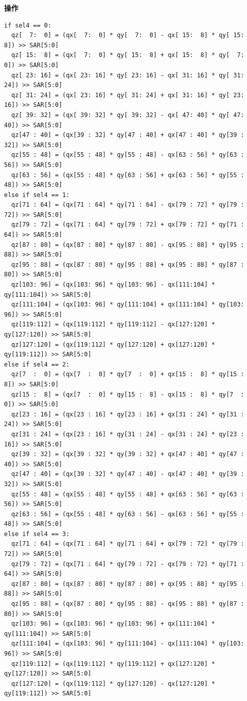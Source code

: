 \textbf{操作}\\
\begin{lstlisting}
if sel4 == 0:
  qz[  7:  0] = (qx[  7:  0] * qy[  7:  0] - qx[ 15:  8] * qy[ 15:  8]) >> SAR[5:0]
  qz[ 15:  8] = (qx[  7:  0] * qy[ 15:  8] + qx[ 15:  8] * qy[  7:  0]) >> SAR[5:0]
  qz[ 23: 16] = (qx[ 23: 16] * qy[ 23: 16] - qx[ 31: 16] * qy[ 31: 24]) >> SAR[5:0]
  qz[ 31: 24] = (qx[ 23: 16] * qy[ 31: 24] + qx[ 31: 16] * qy[ 23: 16]) >> SAR[5:0]
  qz[ 39: 32] = (qx[ 39: 32] * qy[ 39: 32] - qx[ 47: 40] * qy[ 47: 40]) >> SAR[5:0]
  qz[47 : 40] = (qx[39 : 32] * qy[47 : 40] + qx[47 : 40] * qy[39 : 32]) >> SAR[5:0]
  qz[55 : 48] = (qx[55 : 48] * qy[55 : 48] - qx[63 : 56] * qy[63 : 56]) >> SAR[5:0]
  qz[63 : 56] = (qx[55 : 48] * qy[63 : 56] + qx[63 : 56] * qy[55 : 48]) >> SAR[5:0]
else if sel4 == 1:
  qz[71 : 64] = (qx[71 : 64] * qy[71 : 64] - qx[79 : 72] * qy[79 : 72]) >> SAR[5:0]
  qz[79 : 72] = (qx[71 : 64] * qy[79 : 72] + qx[79 : 72] * qy[71 : 64]) >> SAR[5:0]
  qz[87 : 80] = (qx[87 : 80] * qy[87 : 80] - qx[95 : 88] * qy[95 : 88]) >> SAR[5:0]
  qz[95 : 88] = (qx[87 : 80] * qy[95 : 88] + qx[95 : 88] * qy[87 : 80]) >> SAR[5:0]
  qz[103: 96] = (qx[103: 96] * qy[103: 96] - qx[111:104] * qy[111:104]) >> SAR[5:0]
  qz[111:104] = (qx[103: 96] * qy[111:104] + qx[111:104] * qy[103: 96]) >> SAR[5:0]
  qz[119:112] = (qx[119:112] * qy[119:112] - qx[127:120] * qy[127:120]) >> SAR[5:0]
  qz[127:120] = (qx[119:112] * qy[127:120] + qx[127:120] * qy[119:112]) >> SAR[5:0]
else if sel4 == 2:
  qz[7  :  0] = (qx[7  :  0] * qy[7  :  0] + qx[15 :  8] * qy[15 :  8]) >> SAR[5:0]
  qz[15 :  8] = (qx[7  :  0] * qy[15 :  8] - qx[15 :  8] * qy[7  :  0]) >> SAR[5:0]
  qz[23 : 16] = (qx[23 : 16] * qy[23 : 16] + qx[31 : 24] * qy[31 : 24]) >> SAR[5:0]
  qz[31 : 24] = (qx[23 : 16] * qy[31 : 24] - qx[31 : 24] * qy[23 : 16]) >> SAR[5:0]
  qz[39 : 32] = (qx[39 : 32] * qy[39 : 32] + qx[47 : 40] * qy[47 : 40]) >> SAR[5:0]
  qz[47 : 40] = (qx[39 : 32] * qy[47 : 40] - qx[47 : 40] * qy[39 : 32]) >> SAR[5:0]
  qz[55 : 48] = (qx[55 : 48] * qy[55 : 48] + qx[63 : 56] * qy[63 : 56]) >> SAR[5:0]
  qz[63 : 56] = (qx[55 : 48] * qy[63 : 56] - qx[63 : 56] * qy[55 : 48]) >> SAR[5:0]
else if sel4 == 3:
  qz[71 : 64] = (qx[71 : 64] * qy[71 : 64] + qx[79 : 72] * qy[79 : 72]) >> SAR[5:0]
  qz[79 : 72] = (qx[71 : 64] * qy[79 : 72] - qx[79 : 72] * qy[71 : 64]) >> SAR[5:0]
  qz[87 : 80] = (qx[87 : 80] * qy[87 : 80] + qx[95 : 88] * qy[95 : 88]) >> SAR[5:0]
  qz[95 : 88] = (qx[87 : 80] * qy[95 : 88] - qx[95 : 88] * qy[87 : 80]) >> SAR[5:0]
  qz[103: 96] = (qx[103: 96] * qy[103: 96] + qx[111:104] * qy[111:104]) >> SAR[5:0]
  qz[111:104] = (qx[103: 96] * qy[111:104] - qx[111:104] * qy[103: 96]) >> SAR[5:0]
  qz[119:112] = (qx[119:112] * qy[119:112] + qx[127:120] * qy[127:120]) >> SAR[5:0]
  qz[127:120] = (qx[119:112] * qy[127:120] - qx[127:120] * qy[119:112]) >> SAR[5:0]

\end{lstlisting}

